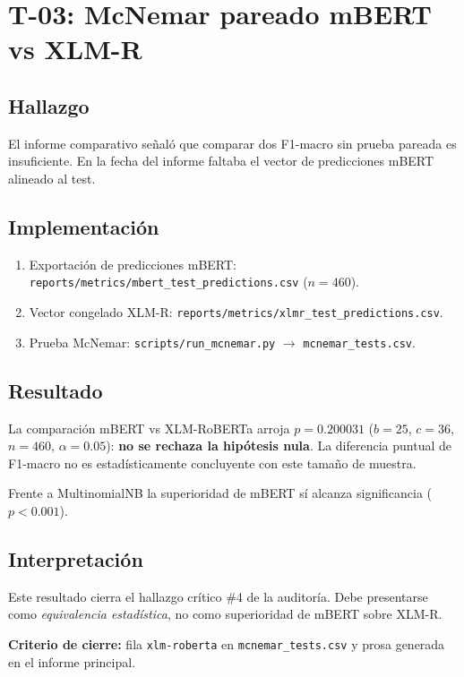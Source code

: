 \chapter{T-03: McNemar pareado mBERT vs XLM-R}

\section{Hallazgo}

El informe comparativo señaló que comparar dos F1-macro sin prueba pareada es insuficiente. En la fecha del informe faltaba el vector de predicciones mBERT alineado al test.

\section{Implementación}

\begin{enumerate}[noitemsep]
  \item Exportación de predicciones mBERT: \texttt{reports/metrics/mbert\_test\_predictions.csv} ($n=460$).
  \item Vector congelado XLM-R: \texttt{reports/metrics/xlmr\_test\_predictions.csv}.
  \item Prueba McNemar: \texttt{scripts/run\_mcnemar.py} $\rightarrow$ \texttt{mcnemar\_tests.csv}.
\end{enumerate}

\section{Resultado}

\begin{table}[H]
  \centering
  \caption{Pruebas de McNemar (extracto)}
  \label{tab:mcnemar}
  
\end{table}

La comparación mBERT vs XLM-RoBERTa arroja $p=0.200031$ ($b=25$, $c=36$, $n=460$, $\alpha=0.05$): \textbf{no se rechaza la hipótesis nula}. La diferencia puntual de F1-macro no es estadísticamente concluyente con este tamaño de muestra.

Frente a MultinomialNB la superioridad de mBERT sí alcanza significancia ($p < 0.001$).

\section{Interpretación}

Este resultado cierra el hallazgo crítico \#4 de la auditoría. Debe presentarse como \emph{equivalencia estadística}, no como superioridad de mBERT sobre XLM-R.

\textbf{Criterio de cierre:} fila \texttt{xlm-roberta} en \texttt{mcnemar\_tests.csv} y prosa generada en el informe principal.
